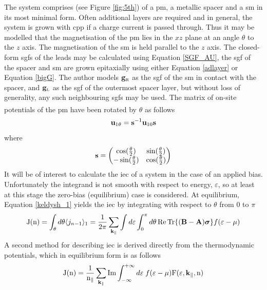 \documentclass[a4paper, 12pt]{article}
\begin{document}
\par The system comprises (see Figure \ref{fig:5th}) of a \gls{pm}, a metallic spacer and a \gls{sm} in its most minimal form. Often additional layers are required and in general, the system is grown with \gls{cpp} if a charge current is passed through. Thus it may be modelled that the magnetisation of the \gls{pm} lies in the $xz$ plane at an angle $\theta$ to the $z$ axis. The magnetisation of the \gls{sm} is held parallel to the $z$ axis. The closed-form \gls{sgf}s of the leads may be calculated using Equation \eqref{SGF_AU}, the \gls{sgf} of the spacer and \gls{sm} are grown epitaxially using either Equation \eqref{adlayer} or Equation \eqref{bigG}.
The author models $\bf g_{\rm\scriptscriptstyle R}$ as the \gls{sgf} of the \gls{sm} in contact with the spacer, and $\bf g_{\rm\scriptscriptstyle L}$ as the \gls{sgf} of the outermost spacer layer, but without loss of generality, any such neighbouring \gls{sgf}s may be used.
The matrix of on-site potentials of the \gls{pm} have been rotated by $\theta$ as follows\textcolor{blue}{\textsuperscript{\cite{SC}}}
\begin{equation}
	\rm\bf u_{\rm 1 \theta}\; {\rm =}\; s^{\rm -1}u_{\rm 1 0}s
\end{equation}
where 
\begin{equation}
	{\bf s} = \begin{pmatrix} \cos(\frac{\theta}{2})&\sin(\frac{\theta}{2})\\-\sin(\frac{\theta}{2})&\cos(\frac{\theta}{2}) \end{pmatrix}
\end{equation}
It will be of interest to calculate the \gls{iec} of a system in the case of an applied bias. Unfortunately the integrand is not smooth with respect to energy, $\varepsilon$, so at least at this stage the zero-bias (equilibrium) case is considered.
At equilibrium, Equation \eqref{keldysh_1} yields the \gls{iec} by integrating with respect to $\theta$ from $0$ to $	\pi$
\begin{equation}\label{alt_exchange}
	{\rm J(n)}= \int_\theta d\theta \langle j_{n-1}\rangle_1 = \frac{1}{2\pi}\sum_{\bf k_\parallel}\int d\varepsilon \int_0^\pi d\theta\,\rm Re \, Tr \lbrace \bf (B-A)\bm\sigma\rbrace \mathnormal f(\varepsilon - \mu)
\end{equation}
A second method for describing \gls{iec} is derived directly from the thermodynamic potentials, which in equilibrium form is as follows
\begin{equation}\label{exchange}
	\rm J(n) = \frac{1}{n_\parallel}\sum_{\bf k_\parallel}Im\int_{-\infty}^{+\infty}{\mathnormal d}\varepsilon\;{\mathnormal f}(\varepsilon - \mu)F(\varepsilon, {\bf k_\parallel}, n)
\end{equation}
\end{document}

